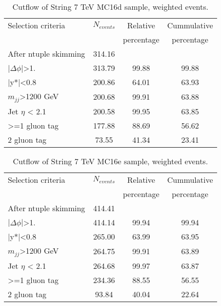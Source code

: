 \begin{table}[ht]
\begin{center}
\begin{tabular}{|l|c|c|c|}
\hline
Selection criteria & $N_{events}$ & Relative & Cummulative \\
 & & percentage & percentage \\
\hline
After ntuple skimming & 314.16 &  &  \\
$|\Delta\phi|$>1. & 313.79 & 99.88 & 99.88 \\
|y*|<0.8 & 200.86 & 64.01 & 63.93 \\
$m_{jj}$>1200 GeV & 200.68 & 99.91 & 63.88 \\
Jet $\eta$ < 2.1 & 200.58 & 99.95 & 63.85 \\
>=1 gluon tag & 177.88 & 88.69 & 56.62 \\
2 gluon tag & 73.55 & 41.34 & 23.41 \\
\hline
\end{tabular}
\end{center}
\caption{Cutflow of String 7 TeV MC16d sample, weighted events.}
\label{tab:String7MC16d}
\end{table}

\begin{table}[ht]
\begin{center}
\begin{tabular}{|l|c|c|c|}
\hline
Selection criteria & $N_{events}$ & Relative & Cummulative \\
 & & percentage & percentage \\
\hline
After ntuple skimming & 414.41 &  &  \\
$|\Delta\phi|$>1. & 414.14 & 99.94 & 99.94 \\
|y*|<0.8 & 265.00 & 63.99 & 63.95 \\
$m_{jj}$>1200 GeV & 264.75 & 99.91 & 63.89 \\
Jet $\eta$ < 2.1 & 264.68 & 99.97 & 63.87 \\
>=1 gluon tag & 234.36 & 88.55 & 56.55 \\
2 gluon tag & 93.84 & 40.04 & 22.64 \\
\hline
\end{tabular}
\end{center}
\caption{Cutflow of String 7 TeV MC16e sample, weighted events.}
\label{tab:String7MC16e}
\end{table}

